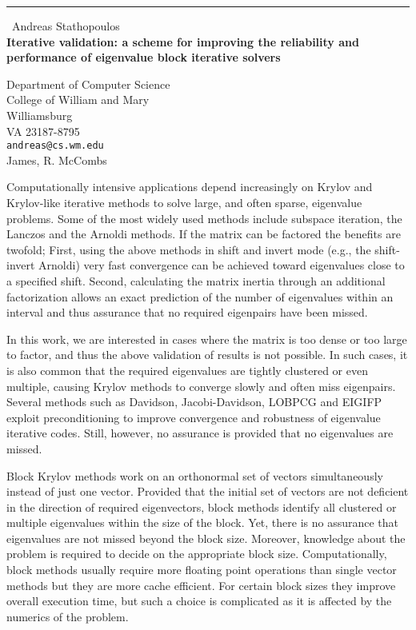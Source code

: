 \documentclass{report}
\begin{document}
\begin{center}
\rule{6in}{1pt} \
{\large Andreas Stathopoulos \\
{\bf Iterative validation: a scheme for improving the reliability and performance of eigenvalue block iterative solvers}}

Department of Computer Science  \\           College of William and Mary \\ Williamsburg \\ VA 23187-8795
\\
{\tt andreas@cs.wm.edu}\\
James, R. McCombs\end{center}

Computationally intensive applications depend increasingly on
Krylov and Krylov-like iterative methods to solve large, and often sparse,
eigenvalue problems.
Some of the most widely used methods include subspace iteration,
the Lanczos and the Arnoldi methods.
If the matrix can be factored the benefits are twofold;
First, using the above methods in shift and invert mode
(e.g., the shift-invert Arnoldi) very fast convergence can be achieved
toward eigenvalues close to a specified shift.
Second, calculating the matrix inertia through an additional factorization
allows an exact prediction of the number of eigenvalues within an interval
and thus assurance that no required eigenpairs have been missed.

In this work, we are interested in cases where the matrix is too dense
or too large to factor, and thus the above validation of results is
not possible.
In such cases, it is also common that the required eigenvalues are
tightly clustered or even multiple, causing Krylov methods to converge
slowly and often miss eigenpairs.
Several methods such as Davidson, Jacobi-Davidson, LOBPCG and EIGIFP
exploit preconditioning to improve convergence and robustness of
eigenvalue iterative codes.
Still, however, no assurance is provided that no eigenvalues are missed.

Block Krylov methods work on an orthonormal set of vectors simultaneously
instead of just one vector.
Provided that the initial set of vectors are not deficient in the direction
of required eigenvectors, block methods identify all clustered or
multiple eigenvalues within the size of the block.
Yet, there is no assurance that eigenvalues are not missed beyond the
block size.
Moreover, knowledge about the problem is required to decide on the
appropriate block size.
Computationally, block methods usually require more floating point
operations than single vector methods but they are more cache efficient.
For certain block sizes they improve overall execution time, but such
a choice is complicated as it is affected by the numerics of the problem.
\end{document}
